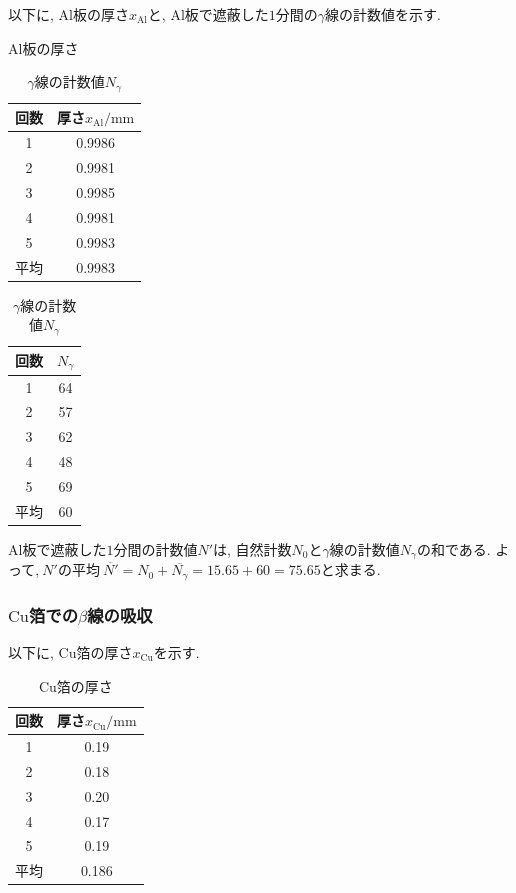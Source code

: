 \documentclass{jarticle}
\begin{document}
以下に, $\mathrm{Al}$板の厚さ$x_\mathrm{Al}$と, $\mathrm{Al}$板で遮蔽した$1$分間の$\gamma$線の計数値を示す.

\begin{table}[H]
  \begin{minipage}[t]{0.45\textwidth}
    \centering
    \caption{$\mathrm{Al}$板の厚さ}
    \label{tb:Al-plate-thickness}
    \begin{tabular}{cc}
      \hline
      回数 & 厚さ$x_\mathrm{Al}/\mathrm{mm}$ \\
      \hline
      1 & 0.9986 \\
      2 & 0.9981 \\
      3 & 0.9985 \\
      4 & 0.9981 \\
      5 & 0.9983 \\
      \hline
      平均 & 0.9983 \\
      \hline
    \end{tabular}
  \end{minipage}
  \begin{minipage}[t]{0.45\textwidth}
    \centering
    \caption{$\gamma$線の計数値$N_\gamma$}
    \label{tb:gamma-count-distribution}
    \begin{tabular}{cc}
      \hline
      回数 & $N_\gamma$ \\
      \hline
      1 & 64 \\
      2 & 57 \\
      3 & 62 \\
      4 & 48 \\
      5 & 69 \\
      \hline
      平均 & 60 \\
      \hline
    \end{tabular}
  \end{minipage}
\end{table}

$\mathrm{Al}$板で遮蔽した$1$分間の計数値$N'$は, 自然計数$N_0$と$\gamma$線の計数値$N_\gamma$の和である.
よって,$\ N'$の平均$\ \overline{N'} = N_0 + \overline{N_\gamma} = 15.65 + 60 = 75.65$と求まる.


\subsubsection{$\mathrm{Cu}$箔での$\beta$線の吸収}

以下に, $\mathrm{Cu}$箔の厚さ$x_\mathrm{Cu}$を示す.

\begin{table}[H]
  \centering
  \caption{$\mathrm{Cu}$箔の厚さ}
  \label{tb:Cu-foil-thickness}
  \begin{tabular}{cc}
    \hline
    回数 & 厚さ$x_\mathrm{Cu}/\mathrm{mm}$ \\
    \hline
    1 & 0.19 \\
    2 & 0.18 \\
    3 & 0.20 \\
    4 & 0.17 \\
    5 & 0.19 \\
    \hline
    平均 & 0.186 \\
    \hline
  \end{tabular}
\end{table}
\end{document}
